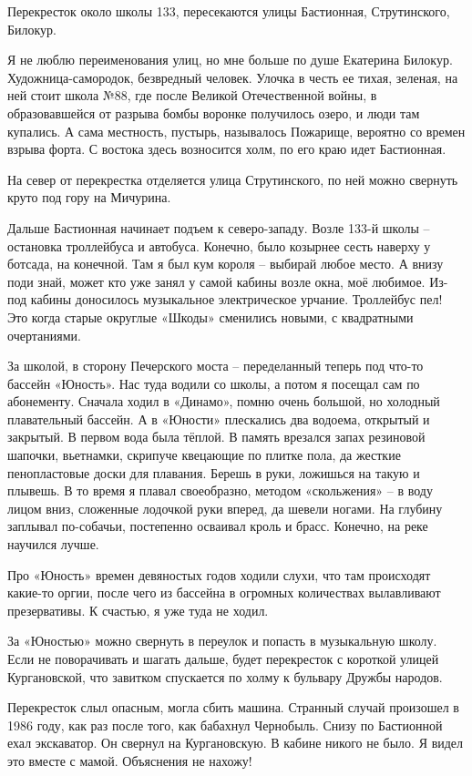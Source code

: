 Перекресток около школы 133, пересекаются улицы Бастионная, Струтинского, Билокур.

Я не люблю переименования улиц, но мне больше по душе Екатерина Билокур. Художница-самородок, безвредный человек. Улочка в честь ее тихая, зеленая, на ней стоит школа №88, где после Великой Отечественной войны, в образовавшейся от разрыва бомбы воронке получилось озеро, и люди там купались. А сама местность, пустырь, называлось Пожарище, вероятно со времен взрыва форта. С востока здесь возносится холм, по его краю идет Бастионная.

На север от перекрестка отделяется улица Струтинского, по ней можно свернуть круто под гору на Мичурина.

Дальше Бастионная начинает подъем к северо-западу. Возле 133-й школы – остановка троллейбуса и автобуса. Конечно, было козырнее сесть наверху у ботсада, на конечной. Там я был кум короля – выбирай любое место. А внизу поди знай, может кто уже занял у самой кабины возле окна, моё любимое. Из-под кабины доносилось музыкальное электрическое урчание. Троллейбус пел! Это когда старые округлые «Шкоды» сменились новыми, с квадратными очертаниями.
 
За школой, в сторону Печерского моста – переделанный теперь под что-то бассейн «Юность». Нас туда водили со школы, а потом я посещал сам по абонементу. Сначала ходил в  «Динамо», помню очень большой, но холодный плавательный бассейн. А в «Юности» плескались два водоема, открытый и закрытый. В первом вода была тёплой. В память врезался запах резиновой шапочки, вьетнамки, скрипуче квецающие по плитке пола, да жесткие пенопластовые доски для плавания. Берешь в руки, ложишься на такую и плывешь. В то время я плавал своеобразно, методом «скольжения» – в воду лицом вниз, сложенные лодочкой руки вперед, да шевели ногами. На глубину заплывал по-собачьи, постепенно осваивал кроль и брасс. Конечно, на реке научился лучше.
 
Про «Юность» времен девяностых годов ходили слухи, что там происходят какие-то оргии, после чего из бассейна в огромных количествах вылавливают презервативы. К счастью, я уже туда не ходил.

За «Юностью» можно свернуть в переулок и попасть в музыкальную школу. Если не поворачивать и шагать дальше, будет перекресток с короткой улицей Кургановской, что завитком спускается по холму к бульвару Дружбы народов. 

Перекресток слыл опасным, могла сбить машина. Странный случай произошел в 1986 году, как раз после того, как бабахнул Чернобыль. Снизу по Бастионной ехал экскаватор. Он свернул на Кургановскую. В кабине никого не было. Я видел это вместе с мамой. Объяснения не нахожу!


